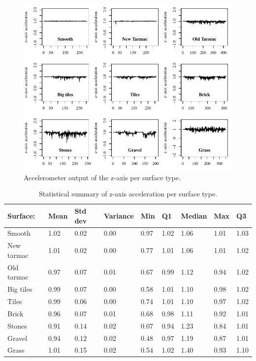 \begin{figure}[H]
\includegraphics[width=\textwidth]{img/R_AllsurfaceGraphs.pdf}
\centering
\caption{Accelerometer output of the z-axis per surface type.\label{figsurfaces}}
\end{figure} 

\begin{table}[ht]
\caption{Statistical summary of z-axis acceleration per surface type. \label{surfacehindrance}}
\centering
\begin{tabular}{|p{46pt}|p{30pt}|p{30pt}|p{30pt}|p{30pt}|p{30pt}|p{30pt}|p{30pt}|p{30pt}|}
\hline
Surface: & Mean & Std dev & Variance & Min & Q1 & Median & Max & Q3\\
\hline
Smooth & 1.02 & 0.02 & 0.00 & 0.97 & 1.02 & 1.06 & 1.01 & 1.03 \\
New tarmac & 1.01 & 0.02 & 0.00 & 0.77 & 1.01 & 1.06 & 1.01 & 1.02\\
Old tarmac & 0.97 & 0.07 & 0.01 & 0.67 & 0.99 & 1.12 & 0.94 & 1.02\\
Big tiles & 0.99 & 0.07 & 0.00 & 0.58 & 1.01 & 1.10 & 0.98 & 1.02\\
Tiles & 0.99 & 0.06 & 0.00 & 0.74 & 1.01 & 1.10 & 0.97 & 1.02\\
Brick & 0.96 & 0.07 & 0.01 & 0.68 & 0.98 & 1.11 & 0.92 & 1.01\\
Stones & 0.91 & 0.14 & 0.02 & 0.07 & 0.94 & 1.23 & 0.84 & 1.01\\
Gravel & 0.94 & 0.12 & 0.02 & 0.48 & 0.97 & 1.19 & 0.87 & 1.01\\
Grass & 1.01 & 0.15 & 0.02 & 0.54 & 1.02 & 1.40 & 0.93 & 1.10\\
\hline
\end{tabular}
\end{table}

